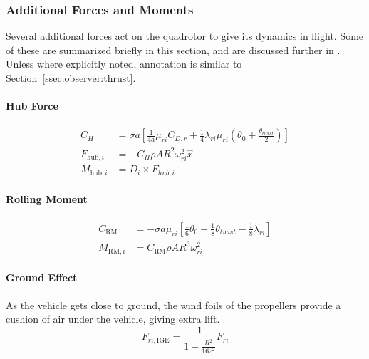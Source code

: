 \subsubsection{Additional Forces and Moments}
\label{ssec:observer:additionalforces}
    Several additional forces act on the quadrotor to give its dynamics in flight.
    Some of these are summarized briefly in this section, and are discussed further in \citep{bouabdallah07full}.
    Unless where explicitly noted, annotation is similar to Section~\ref{ssec:observer:thrust}.
    \paragraph{Hub Force}
        \begin{align}
            C_{H} &= \sigma a \left[
                \frac{1}{4a}\mu_{ri}C_{D,r}
                + \frac{1}{4}\lambda_{ri}\mu_{ri}\left( \theta_{0} + \frac{\theta_{twist}}{2} \right)
                \right] \\
%
            F_{\text{hub},i} &= -C_{H} \rho A R^{2} \omega_{ri}^{2}\hat{x} \\
%
            M_{\text{hub},i} &= D_{i} \times F_{hub,i}
        \end{align}

    \paragraph{Rolling Moment}
        \begin{align}
            C_{\text{RM}} &= - \sigma a \mu_{ri} \left[
                \frac{1}{6}\theta_{0}
                + \frac{1}{8}\theta_{twist}
                - \frac{1}{8}\lambda_{ri}
                \right] \\
%
            M_{\text{RM},i} &= C_{\text{RM}} \rho A R^{3} \omega_{ri}^{2}
        \end{align}

    \paragraph{Ground Effect\newline}
        As the vehicle gets close to ground, the wind foils of the propellers
        provide a cushion of air under the vehicle, giving extra lift.
        \begin{equation}
            F_{ri,\text{IGE}} = \frac{1}{1-\frac{R^{2}}{16z^{2}}} F_{ri}
        \end{equation}

